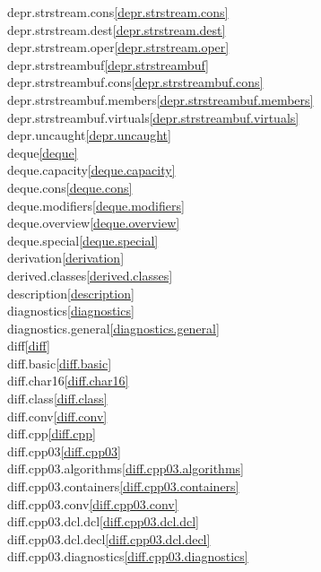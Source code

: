 \begin{multicols}{2}
depr.strstream.cons\quad\ref{depr.strstream.cons}\\
depr.strstream.dest\quad\ref{depr.strstream.dest}\\
depr.strstream.oper\quad\ref{depr.strstream.oper}\\
depr.strstreambuf\quad\ref{depr.strstreambuf}\\
depr.strstreambuf.cons\quad\ref{depr.strstreambuf.cons}\\
depr.strstreambuf.members\quad\ref{depr.strstreambuf.members}\\
depr.strstreambuf.virtuals\quad\ref{depr.strstreambuf.virtuals}\\
depr.uncaught\quad\ref{depr.uncaught}\\
deque\quad\ref{deque}\\
deque.capacity\quad\ref{deque.capacity}\\
deque.cons\quad\ref{deque.cons}\\
deque.modifiers\quad\ref{deque.modifiers}\\
deque.overview\quad\ref{deque.overview}\\
deque.special\quad\ref{deque.special}\\
derivation\quad\ref{derivation}\\
derived.classes\quad\ref{derived.classes}\\
description\quad\ref{description}\\
diagnostics\quad\ref{diagnostics}\\
diagnostics.general\quad\ref{diagnostics.general}\\
diff\quad\ref{diff}\\
diff.basic\quad\ref{diff.basic}\\
diff.char16\quad\ref{diff.char16}\\
diff.class\quad\ref{diff.class}\\
diff.conv\quad\ref{diff.conv}\\
diff.cpp\quad\ref{diff.cpp}\\
diff.cpp03\quad\ref{diff.cpp03}\\
diff.cpp03.algorithms\quad\ref{diff.cpp03.algorithms}\\
diff.cpp03.containers\quad\ref{diff.cpp03.containers}\\
diff.cpp03.conv\quad\ref{diff.cpp03.conv}\\
diff.cpp03.dcl.dcl\quad\ref{diff.cpp03.dcl.dcl}\\
diff.cpp03.dcl.decl\quad\ref{diff.cpp03.dcl.decl}\\
diff.cpp03.diagnostics\quad\ref{diff.cpp03.diagnostics}\\

\end{multicols}
